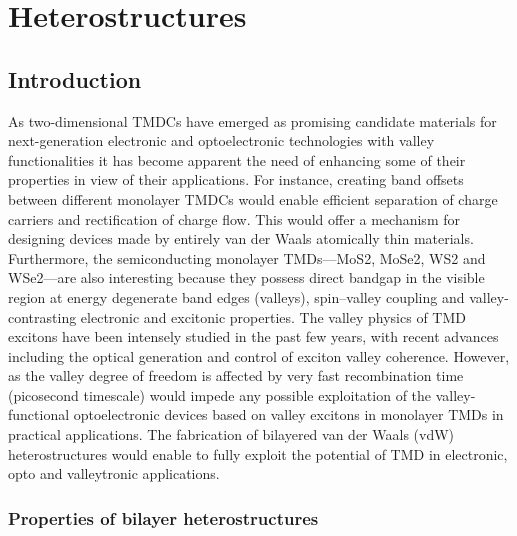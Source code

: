 \section{Heterostructures}

\subsection{Introduction}

As two-dimensional TMDCs have emerged as promising candidate materials for next-generation electronic and optoelectronic technologies with valley functionalities it has become apparent the need of enhancing some of their properties in view of their applications. For instance, creating band offsets between different monolayer TMDCs would enable efficient separation of charge carriers and rectification of charge flow. This would offer a mechanism for designing devices made by entirely van der Waals atomically thin materials.  Furthermore, the semiconducting monolayer TMDs—MoS2, MoSe2, WS2 and WSe2—are also interesting because they possess direct bandgap in the visible region at energy degenerate band edges (valleys), spin–valley coupling and valley-contrasting electronic and excitonic properties.
 The valley physics of TMD excitons have been intensely studied in the past few years, with recent advances including the optical generation and control of exciton valley coherence. However, as the valley degree of freedom is affected by very fast recombination time (picosecond timescale) would impede any possible exploitation of the valley-functional optoelectronic devices based on valley excitons in monolayer TMDs in practical applications. The fabrication of bilayered van der Waals (vdW) heterostructures would enable to fully exploit the potential of TMD in electronic, opto and valleytronic applications.

\subsubsection{Properties of bilayer heterostructures}

